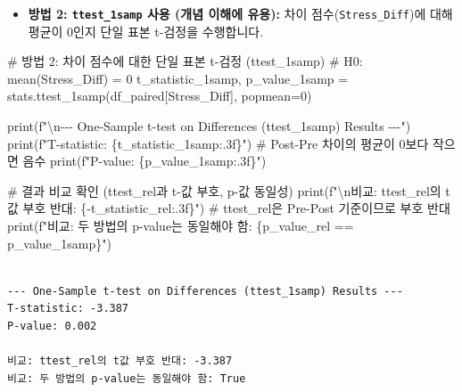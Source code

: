\documentclass[
  letterpaper,
]{book}
\newenvironment{Shaded}{\begin{snugshade}}{\end{snugshade}}
\newcommand{\BuiltInTok}[1]{\textcolor[rgb]{0.00,0.23,0.31}{#1}}
\newcommand{\CharTok}[1]{\textcolor[rgb]{0.13,0.47,0.30}{#1}}
\newcommand{\CommentTok}[1]{\textcolor[rgb]{0.37,0.37,0.37}{#1}}
\newcommand{\DecValTok}[1]{\textcolor[rgb]{0.68,0.00,0.00}{#1}}
\newcommand{\NormalTok}[1]{\textcolor[rgb]{0.00,0.23,0.31}{#1}}
\newcommand{\OperatorTok}[1]{\textcolor[rgb]{0.37,0.37,0.37}{#1}}
\newcommand{\SpecialCharTok}[1]{\textcolor[rgb]{0.37,0.37,0.37}{#1}}
\newcommand{\SpecialStringTok}[1]{\textcolor[rgb]{0.13,0.47,0.30}{#1}}
\newcommand{\StringTok}[1]{\textcolor[rgb]{0.13,0.47,0.30}{#1}}
\providecommand{\tightlist}{%
  \setlength{\itemsep}{0pt}\setlength{\parskip}{0pt}}
\begin{document}
\begin{itemize}
\tightlist
\item
  \textbf{방법 2: \texttt{ttest\_1samp} 사용 (개념 이해에 유용):} 차이
  점수(\texttt{Stress\_Diff})에 대해 평균이 0인지 단일 표본 t-검정을
  수행합니다.
\end{itemize}

\begin{Shaded}
\begin{Highlighting}[]
    \CommentTok{\# 방법 2: 차이 점수에 대한 단일 표본 t{-}검정 (ttest\_1samp)}
    \CommentTok{\# H0: mean(Stress\_Diff) = 0}
\NormalTok{    t\_statistic\_1samp, p\_value\_1samp }\OperatorTok{=}\NormalTok{ stats.ttest\_1samp(df\_paired[}\StringTok{\textquotesingle{}Stress\_Diff\textquotesingle{}}\NormalTok{], popmean}\OperatorTok{=}\DecValTok{0}\NormalTok{)}

    \BuiltInTok{print}\NormalTok{(}\SpecialStringTok{f"}\CharTok{\textbackslash{}n}\SpecialStringTok{{-}{-}{-} One{-}Sample t{-}test on Differences (ttest\_1samp) Results {-}{-}{-}"}\NormalTok{)}
    \BuiltInTok{print}\NormalTok{(}\SpecialStringTok{f"T{-}statistic: }\SpecialCharTok{\{}\NormalTok{t\_statistic\_1samp}\SpecialCharTok{:.3f\}}\SpecialStringTok{"}\NormalTok{) }\CommentTok{\# Post{-}Pre 차이의 평균이 0보다 작으면 음수}
    \BuiltInTok{print}\NormalTok{(}\SpecialStringTok{f"P{-}value: }\SpecialCharTok{\{}\NormalTok{p\_value\_1samp}\SpecialCharTok{:.3f\}}\SpecialStringTok{"}\NormalTok{)}

    \CommentTok{\# 결과 비교 확인 (ttest\_rel과 t{-}값 부호, p{-}값 동일성)}
    \BuiltInTok{print}\NormalTok{(}\SpecialStringTok{f"}\CharTok{\textbackslash{}n}\SpecialStringTok{비교: ttest\_rel의 t값 부호 반대: }\SpecialCharTok{\{}\OperatorTok{{-}}\NormalTok{t\_statistic\_rel}\SpecialCharTok{:.3f\}}\SpecialStringTok{"}\NormalTok{) }\CommentTok{\# ttest\_rel은 Pre{-}Post 기준이므로 부호 반대}
    \BuiltInTok{print}\NormalTok{(}\SpecialStringTok{f"비교: 두 방법의 p{-}value는 동일해야 함: }\SpecialCharTok{\{}\NormalTok{p\_value\_rel }\OperatorTok{==}\NormalTok{ p\_value\_1samp}\SpecialCharTok{\}}\SpecialStringTok{"}\NormalTok{)}
\end{Highlighting}
\end{Shaded}

\begin{verbatim}

--- One-Sample t-test on Differences (ttest_1samp) Results ---
T-statistic: -3.387
P-value: 0.002

비교: ttest_rel의 t값 부호 반대: -3.387
비교: 두 방법의 p-value는 동일해야 함: True
\end{verbatim}
\end{document}

